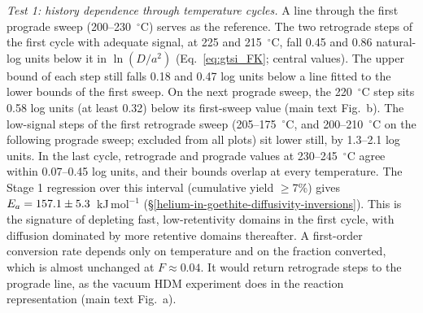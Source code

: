 \textit{Test 1: history dependence through temperature cycles.} A line through the first
prograde sweep (200--230~$^\circ$C) serves as the reference. The two retrograde steps of the
first cycle with adequate signal, at 225 and 215~$^\circ$C, fall 0.45 and 0.86 natural-log units
below it in $\ln(D/a^2)$ (Eq.~\eqref{eq:gtsi_FK}; central values). The upper bound of each step
still falls 0.18 and 0.47 log units below a line fitted to the lower bounds of the first sweep.
On the next prograde sweep, the 220~$^\circ$C step sits 0.58 log units (at least 0.32) below its
first-sweep value (main text Fig.~\MainFigGtArrhenius{}b). The low-signal steps of the first
retrograde sweep (205--175~$^\circ$C, and 200--210~$^\circ$C on the following prograde sweep;
excluded from all plots) sit lower still, by 1.3--2.1 log units. In the last cycle, retrograde and
prograde values at 230--245~$^\circ$C agree within 0.07--0.45 log units, and their bounds
overlap at every temperature. The Stage 1 regression over this interval (cumulative yield
$\geq$7\%) gives $E_a = 157.1\pm5.3$~kJ\,mol$^{-1}$
(\S\ref{helium-in-goethite-diffusivity-inversions}). This is the signature of depleting fast,
low-retentivity domains in the first cycle, with diffusion dominated by more retentive domains
thereafter. A first-order conversion rate depends only on temperature and on the fraction
converted, which is almost unchanged at $F\approx0.04$. It would return retrograde steps to the
prograde line, as the vacuum HDM experiment does in the reaction representation
(main text Fig.~\MainFigGtArrhenius{}a).

